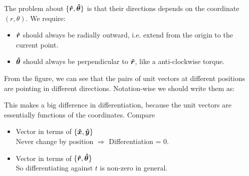 \documentclass[class=article, crop=false, 12pt]{standalone}
\begin{document}
The problem about $\{\vu*{r}, \vu*{\theta}\}$ is that their directions depends on the coordinate $(r, \theta)$. 
We require:
\begin{itemize}
    \item $\vu*{r}$ should always be radially outward, 
    i.e. extend from the origin to the current point.
    
    \item $\vu*{\theta}$ should always be perpendicular to $\vu*{r}$, 
    like a anti-clockwise torque. 
    
\end{itemize}



From the figure, we can see that the pairs of unit vectors at different positions are pointing in different directions. 
Notation-wise we should write them as:

This makes a big difference in differentiation, because the unit vectors are essentially functions of the coordinates. Compare
\begin{itemize}
    \item Vector in terms of $\{\vu*{x}, \vu*{y}\}$\\
    Never change by position $\Rightarrow$ Differentiation = 0.
    

    \item Vector in terms of $\{\vu*{r}, \vu*{\theta}\}$\\
    So differentiating against $t$ is non-zero in general.

\end{itemize}
\end{document}
